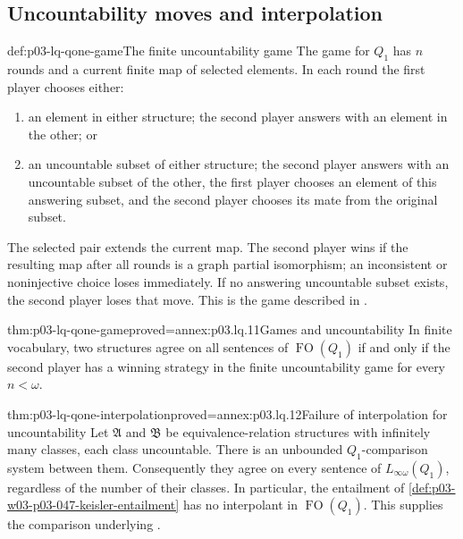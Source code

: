 \subsection{Uncountability moves and interpolation}

\begin{hbdefinition}{def:p03-lq-qone-game}{The finite uncountability game}
The game for \(Q_1\) has \(n\) rounds and a current finite map of
selected elements. In each round the first player chooses either:
\begin{enumerate}
 \item an element in either structure; the second player answers
       with an element in the other; or
 \item an uncountable subset of either structure; the second player
       answers with an uncountable subset of the other, the first
       player chooses an element of this answering subset, and the
       second player chooses its mate from the original subset.
\end{enumerate}
The selected pair extends the current map. The second player wins
if the resulting map after all rounds is a graph partial isomorphism;
an inconsistent or noninjective choice loses immediately.
If no answering uncountable subset exists, the second player loses
that move. This is the game described in
\cite[Ch.~II, \S4.2, p.~57]{Ebbinghaus1985ExtendedLogics}.
\end{hbdefinition}

\begin{hbtheorem}{thm:p03-lq-qone-game}{proved=annex:p03.lq.11}{Games and uncountability}
In finite vocabulary, two structures agree on all sentences of
\(\operatorname{FO}(Q_1)\) if and only if the second player has a
winning strategy in the finite uncountability game for every
\(n<\omega\).
\end{hbtheorem}

\begin{hbtheorem}{thm:p03-lq-qone-interpolation}{proved=annex:p03.lq.12}{Failure of interpolation for uncountability}
Let \(\mathfrak A\) and \(\mathfrak B\) be equivalence-relation
structures with infinitely many classes, each class uncountable.
There is an unbounded \(Q_1\)-comparison system between them.
Consequently they agree on every sentence of
\(L_{\infty\omega}(Q_1)\), regardless of the number of their classes.
In particular, the entailment of
\cref{def:p03-w03-p03-047-keisler-entailment} has no interpolant
in \(\operatorname{FO}(Q_1)\).
This supplies the comparison underlying
\cite[Ch.~II, Application~4.2.7, p.~57]{Ebbinghaus1985ExtendedLogics}.
\end{hbtheorem}

